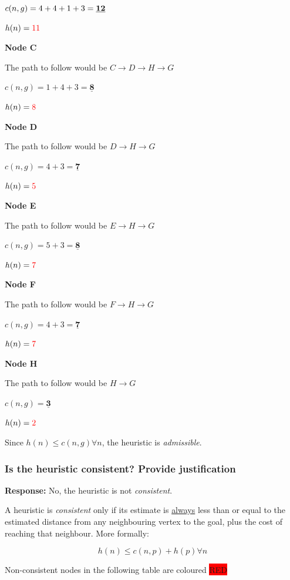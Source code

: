 \documentclass[12pt, letterpaper]{article}
\begin{document}
$c(n,g)=4+4+1+3=\textbf{\underline{12}}$

$h(n)=\textcolor{red}{11}$

\textbf{Node C}

The path to follow would be $C\rightarrow D\rightarrow H\rightarrow G$

$c(n,g)=1+4+3=\underline{\textbf{8}}$

$h(n)=\textcolor{red}{8}$

\textbf{Node D}

The path to follow would be $D\rightarrow H\rightarrow G$

$c(n,g)=4+3=\underline{\textbf{7}}$ 

$h(n)=\textcolor{red}{5}$

\textbf{Node E}

The path to follow would be $E\rightarrow H\rightarrow G$

$c(n,g)=5+3=\underline{\textbf{8}}$ 

$h(n)=\textcolor{red}{7}$

\textbf{Node F}

The path to follow would be $F\rightarrow H\rightarrow G$

$c(n,g)=4+3=\underline{\textbf{7}}$ 

$h(n)=\textcolor{red}{7}$

\textbf{Node H}

The path to follow would be $H\rightarrow G$

$c(n,g)=\underline{\textbf{3}}$ 

$h(n)=\textcolor{red}{2}$

Since $h(n)\leq c(n,g) \forall n$, the heuristic is \textit{admissible}.

\subsubsection{Is the heuristic consistent? Provide justification}
\textbf{Response:} No, the heuristic is not \textit{consistent}.

A heuristic is \textit{consistent} only if its estimate is \underline{always} less than or equal to the estimated distance from any neighbouring vertex to the goal, plus the cost of reaching that neighbour. More formally:

\[h(n) \leq c(n,p) + h(p) \forall n\]

Non-consistent nodes in the following table are coloured \colorbox{red}{RED}
\end{document}
